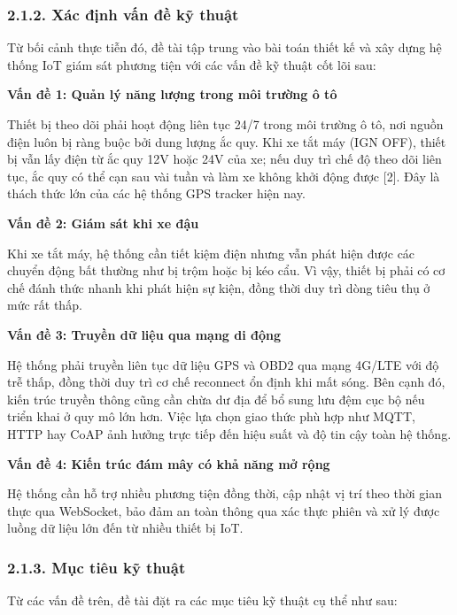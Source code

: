 \documentclass[13pt,a4paper]{extarticle}
\renewcommand{\\}{\thesislongtableorignewline\hline}%
\begin{document}
\subsubsection{2.1.2. Xác định vấn đề kỹ
thuật}\label{212-xuxe1c-ux111ux1ecbnh-vux1ea5n-ux111ux1ec1-kux1ef9-thuux1eadt}

Từ bối cảnh thực tiễn đó, đề tài tập trung vào bài toán thiết kế và xây
dựng hệ thống IoT giám sát phương tiện với các vấn đề kỹ thuật cốt lõi
sau:

\textbf{Vấn đề 1: Quản lý năng lượng trong môi trường ô tô}

Thiết bị theo dõi phải hoạt động liên tục 24/7 trong môi trường ô tô,
nơi nguồn điện luôn bị ràng buộc bởi dung lượng ắc quy. Khi xe tắt máy
(IGN OFF), thiết bị vẫn lấy điện từ ắc quy 12V hoặc 24V của xe; nếu duy
trì chế độ theo dõi liên tục, ắc quy có thể cạn sau vài tuần và làm xe
không khởi động được {[}2{]}. Đây là thách thức lớn của các hệ thống GPS
tracker hiện nay.

\textbf{Vấn đề 2: Giám sát khi xe đậu}

Khi xe tắt máy, hệ thống cần tiết kiệm điện nhưng vẫn phát hiện được các
chuyển động bất thường như bị trộm hoặc bị kéo cẩu. Vì vậy, thiết bị
phải có cơ chế đánh thức nhanh khi phát hiện sự kiện, đồng thời duy trì
dòng tiêu thụ ở mức rất thấp.

\textbf{Vấn đề 3: Truyền dữ liệu qua mạng di động}

Hệ thống phải truyền liên tục dữ liệu GPS và OBD2 qua mạng 4G/LTE với độ
trễ thấp, đồng thời duy trì cơ chế reconnect ổn định khi mất sóng. Bên
cạnh đó, kiến trúc truyền thông cũng cần chừa dư địa để bổ sung lưu đệm
cục bộ nếu triển khai ở quy mô lớn hơn. Việc lựa chọn giao thức phù hợp
như MQTT, HTTP hay CoAP ảnh hưởng trực tiếp đến hiệu suất và độ tin cậy
toàn hệ thống.

\textbf{Vấn đề 4: Kiến trúc đám mây có khả năng mở rộng}

Hệ thống cần hỗ trợ nhiều phương tiện đồng thời, cập nhật vị trí theo
thời gian thực qua WebSocket, bảo đảm an toàn thông qua xác thực phiên
và xử lý được luồng dữ liệu lớn đến từ nhiều thiết bị IoT.

\subsubsection{2.1.3. Mục tiêu kỹ
thuật}\label{213-mux1ee5c-tiuxeau-kux1ef9-thuux1eadt}

Từ các vấn đề trên, đề tài đặt ra các mục tiêu kỹ thuật cụ thể như sau:
\end{document}

